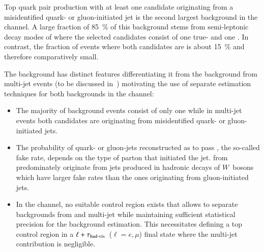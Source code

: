 Top quark pair production with at least one \tauhadvis candidate
originating from a misidentified quark- or gluon-initiated jet is the
second largest background in the \hadhad channel. A large fraction of
\SI{85}{\percent} of this background stems from semi-leptonic decay
modes of \ttbar where the selected \tauhadvis candidates consist of
one true- and one \faketauhadvis. In contrast, the fraction of
\ttbarFakes events where both candidates are \faketauhadvis is about
\SI{15}{\percent} and therefore comparatively small.


The \ttbarFakes background has distinct features differentiating it
from the \faketauhadvis background from multi-jet events (to be
discussed in~) motivating the use of
separate estimation techniques for both backgrounds in the \hadhad
channel:
\begin{itemize}
\item The majority of \ttbarFakes background events consist of only
  one \faketauhadvis while in multi-jet events both \tauhadvis
  candidates are originating from misidentified quark- or
  gluon-initiated jets.

\item The probability of quark- or gluon-jets reconstructed as
  \tauhadvis to pass \tauid, the so-called fake rate, depends on the
  type of parton that initiated the jet. \Faketauhadvis from \ttbar
  predominately originate from jets produced in hadronic decays of
  $W$~bosons which have larger fake rates than the ones originating
  from gluon-initiated jets.

\item In the \hadhad channel, no suitable \ttbarFakes control region
  exists that allows to separate \faketauhadvis backgrounds from
  \ttbar and multi-jet while maintaining sufficient statistical
  precision for the background estimation. This necessitates defining
  a top control region in a $\ell + \tau_{\text{had-vis}}$~($\ell = e, \mu$)
  final state where the multi-jet contribution is negligible.
\end{itemize}

